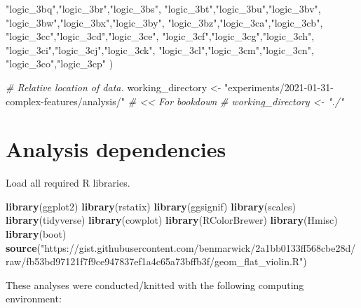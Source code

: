 \documentclass[]{book}
\newenvironment{Shaded}{\begin{snugshade}}{\end{snugshade}}
\newcommand{\CommentTok}[1]{\textcolor[rgb]{0.56,0.35,0.01}{\textit{#1}}}
\newcommand{\KeywordTok}[1]{\textcolor[rgb]{0.13,0.29,0.53}{\textbf{#1}}}
\newcommand{\NormalTok}[1]{#1}
\newcommand{\StringTok}[1]{\textcolor[rgb]{0.31,0.60,0.02}{#1}}
\begin{document}
\begin{Shaded}
\begin{Highlighting}[]
  \StringTok{"logic_3bq"}\NormalTok{,}\StringTok{"logic_3br"}\NormalTok{,}\StringTok{"logic_3bs"}\NormalTok{,}
  \StringTok{"logic_3bt"}\NormalTok{,}\StringTok{"logic_3bu"}\NormalTok{,}\StringTok{"logic_3bv"}\NormalTok{,}
  \StringTok{"logic_3bw"}\NormalTok{,}\StringTok{"logic_3bx"}\NormalTok{,}\StringTok{"logic_3by"}\NormalTok{,}
  \StringTok{"logic_3bz"}\NormalTok{,}\StringTok{"logic_3ca"}\NormalTok{,}\StringTok{"logic_3cb"}\NormalTok{,}
  \StringTok{"logic_3cc"}\NormalTok{,}\StringTok{"logic_3cd"}\NormalTok{,}\StringTok{"logic_3ce"}\NormalTok{,}
  \StringTok{"logic_3cf"}\NormalTok{,}\StringTok{"logic_3cg"}\NormalTok{,}\StringTok{"logic_3ch"}\NormalTok{,}
  \StringTok{"logic_3ci"}\NormalTok{,}\StringTok{"logic_3cj"}\NormalTok{,}\StringTok{"logic_3ck"}\NormalTok{,}
  \StringTok{"logic_3cl"}\NormalTok{,}\StringTok{"logic_3cm"}\NormalTok{,}\StringTok{"logic_3cn"}\NormalTok{,}
  \StringTok{"logic_3co"}\NormalTok{,}\StringTok{"logic_3cp"}
\NormalTok{)}

\CommentTok{# Relative location of data.}
\NormalTok{working_directory <-}\StringTok{ "experiments/2021-01-31-complex-features/analysis/"} \CommentTok{# << For bookdown}
\CommentTok{# working_directory <- "./"}
\end{Highlighting}
\end{Shaded}

\hypertarget{analysis-dependencies-2}{%
\section{Analysis dependencies}\label{analysis-dependencies-2}}

Load all required R libraries.

\begin{Shaded}
\begin{Highlighting}[]
\KeywordTok{library}\NormalTok{(ggplot2)}
\KeywordTok{library}\NormalTok{(rstatix)}
\KeywordTok{library}\NormalTok{(ggsignif)}
\KeywordTok{library}\NormalTok{(scales)}
\KeywordTok{library}\NormalTok{(tidyverse)}
\KeywordTok{library}\NormalTok{(cowplot)}
\KeywordTok{library}\NormalTok{(RColorBrewer)}
\KeywordTok{library}\NormalTok{(Hmisc)}
\KeywordTok{library}\NormalTok{(boot)}
\KeywordTok{source}\NormalTok{(}\StringTok{"https://gist.githubusercontent.com/benmarwick/2a1bb0133ff568cbe28d/raw/fb53bd97121f7f9ce947837ef1a4c65a73bffb3f/geom_flat_violin.R"}\NormalTok{)}
\end{Highlighting}
\end{Shaded}

These analyses were conducted/knitted with the following computing environment:
\end{document}
